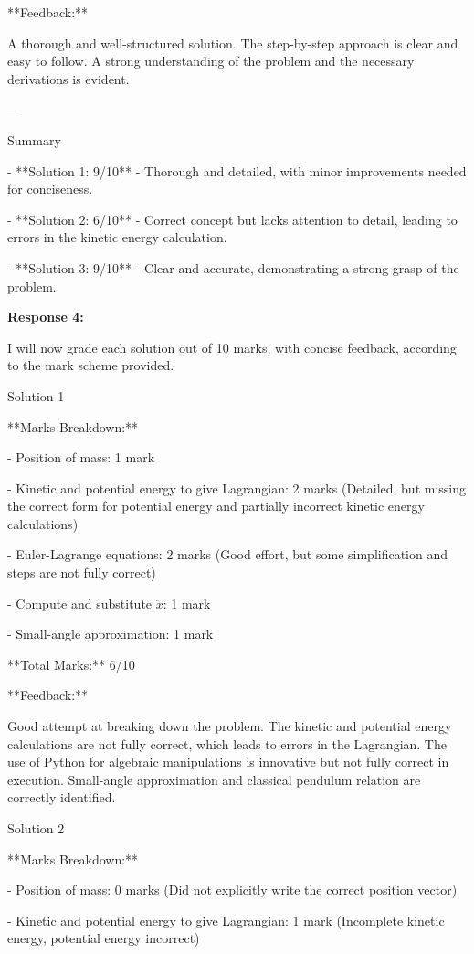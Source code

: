 \documentclass[a4paper,11pt]{article}
\begin{document}
**Feedback:**

A thorough and well-structured solution. The step-by-step approach is clear and easy to follow. A strong understanding of the problem and the necessary derivations is evident.

---

Summary

- **Solution 1: 9/10** - Thorough and detailed, with minor improvements needed for conciseness.

- **Solution 2: 6/10** - Correct concept but lacks attention to detail, leading to errors in the kinetic energy calculation.

- **Solution 3: 9/10** - Clear and accurate, demonstrating a strong grasp of the problem.

\bigskip
\textbf{Response 4:}

I will now grade each solution out of 10 marks, with concise feedback, according to the mark scheme provided.

Solution 1

**Marks Breakdown:**

- Position of mass: 1 mark

- Kinetic and potential energy to give Lagrangian: 2 marks (Detailed, but missing the correct form for potential energy and partially incorrect kinetic energy calculations)

- Euler-Lagrange equations: 2 marks (Good effort, but some simplification and steps are not fully correct)

- Compute and substitute \(\ddot{x}\): 1 mark

- Small-angle approximation: 1 mark

**Total Marks:** 6/10

**Feedback:**

Good attempt at breaking down the problem. The kinetic and potential energy calculations are not fully correct, which leads to errors in the Lagrangian. The use of Python for algebraic manipulations is innovative but not fully correct in execution. Small-angle approximation and classical pendulum relation are correctly identified.

Solution 2

**Marks Breakdown:**

- Position of mass: 0 marks (Did not explicitly write the correct position vector)

- Kinetic and potential energy to give Lagrangian: 1 mark (Incomplete kinetic energy, potential energy incorrect)
\end{document}
